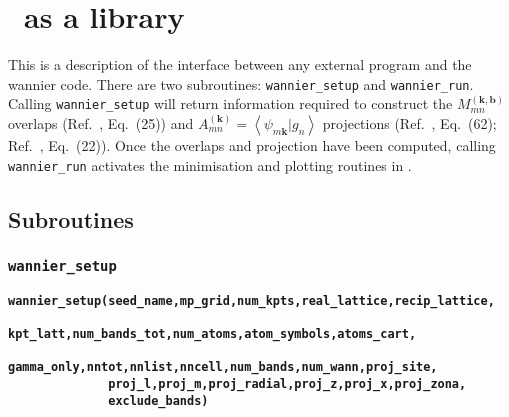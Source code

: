 \chapter{\wannier\ as a library}\label{ch:wann-lib}

This is a description of the interface between any external program and
the wannier code. There are two subroutines: \verb#wannier_setup# and
\verb#wannier_run#. Calling \verb#wannier_setup# will return
information required to 
construct the $M_{mn}^{(\mathbf{k,b})}$ overlaps (Ref.~\cite{MV},
Eq.~(25)) and $A_{mn}^{(\mathbf{k})}=\left\langle
\psi_{m\mathbf{k}}|g_{n}\right\rangle$ projections (Ref.~\cite{MV},
Eq.~(62); Ref.~\cite{SMV}, Eq.~(22)). Once 
the overlaps and projection have been computed, calling
\verb#wannier_run# activates the minimisation and plotting routines in
\wannier.


\section{Subroutines}

\subsection{{\tt wannier\_setup}}

{\noindent \bf \verb#wannier_setup(seed_name,mp_grid,num_kpts,real_lattice,recip_lattice,#\\
\verb#              kpt_latt,num_bands_tot,num_atoms,atom_symbols,atoms_cart,#\\
\verb#              gamma_only,nntot,nnlist,nncell,num_bands,num_wann,proj_site,#\\
\verb#              proj_l,proj_m,proj_radial,proj_z,proj_x,proj_zona,#\\
\verb#              exclude_bands)#}

